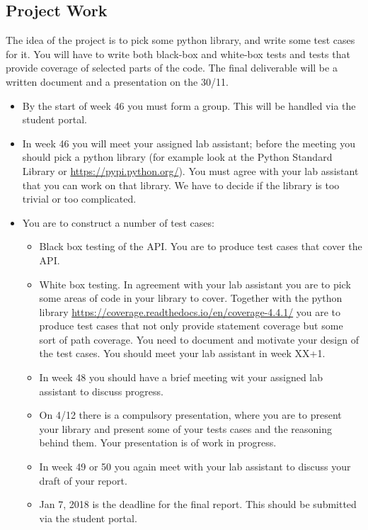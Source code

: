\documentclass[a4page]{article}
\begin{document}
\subsection{Project Work}

The idea of the project is to pick some python library, and write some
test cases for it. You will have to write both black-box and white-box
tests and tests that provide coverage of selected parts of the
code. The final deliverable will be a written document and a
presentation on the 30/11. 
  \begin{itemize}
  \item By  the start of  week  46 you must form a group. This will be
    handled via the student portal.
  \item In week 46 you will meet your assigned lab assistant; before the
    meeting you should pick a python library (for example look at the Python
    Standard Library or \url{https://pypi.python.org/}). You must agree
    with your lab assistant that you can work on that library. We have
    to decide if the library is too trivial or too complicated.
  \item You are to construct a number of test cases:
    \begin{itemize}
    \item  Black box testing of the API. You are to produce test cases
      that cover the API.
    \item  White box testing. In agreement with your lab assistant you
      are to pick some areas of code in your library to cover. Together with
      the python library
      \url{https://coverage.readthedocs.io/en/coverage-4.4.1/} you are
      to produce test cases that not only provide statement coverage
      but some sort of path coverage. You need to document and
      motivate your design of the test cases. You should meet your lab
      assistant in week XX+1.
     \item In week 48 you should have a brief meeting wit your assigned lab
       assistant to discuss progress.
    \item On 4/12 there is a compulsory presentation, where you are
      to present your library and present some of your tests cases
      and the reasoning behind them. Your presentation is of work in
      progress.
    \item In week 49 or 50 you again meet with your lab assistant to
      discuss your draft of your  report.
    \item Jan 7,  2018 is  the deadline for the final
      report. This should be submitted via the student portal.
    \end{itemize}
  \end{itemize}
\end{document}
